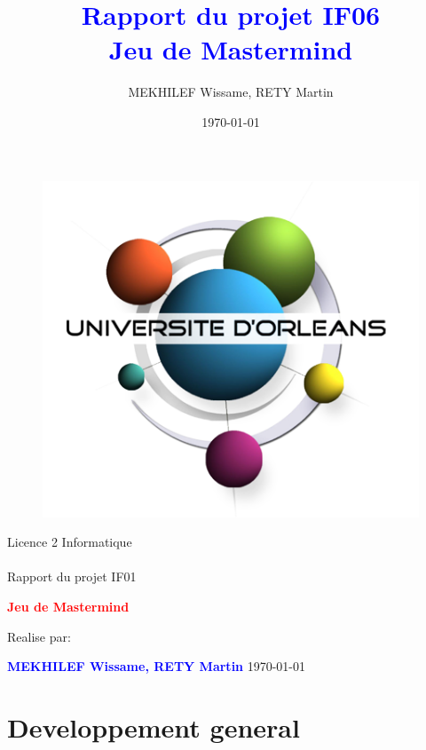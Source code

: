 \documentclass[a4paper,twoside,12pt]{report}
\title{\textcolor{blue}{\Large Rapport du projet IF06}\\\textcolor{blue}{\Large Jeu de Mastermind}}
\author{MEKHILEF Wissame, RETY Martin \date{\today}}
\begin{document}
\thispagestyle{empty}
%
\begin{figure}[H]
\includegraphics[width=0.2\linewidth]{Logo-univ-orleans.png}

\end{figure}
\vspace{2cm}
%
\begin{center}
{\Huge Licence 2 Informatique\\\ \\Rapport du projet IF01}
\par\vspace{1.4cm}

{\Huge\bf \textcolor{red}{\bf Jeu de Mastermind}}
\par\vspace{1.6cm}

{\Large Realise par:}
\par\vspace{1.3cm}
{\large\bf \textcolor{blue}{MEKHILEF Wissame, RETY Martin}}
\vfill
\today
\end{center}


\newpage
\pagestyle{fancy}

\begin{abstract}
%
\end{abstract}
 
\newpage
\tableofcontents
\listoffigures
\newpage

\chapter{Developpement general}
% 
\end{document}
